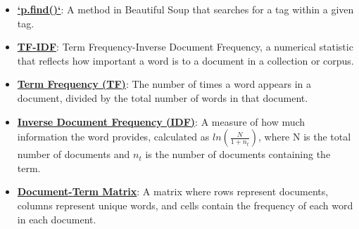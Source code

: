 \documentclass{article}%
\begin{document}
\begin{itemize}[leftmargin=*]
\item \href{https://purdue.brightspace.com/d2l/common/assets/pdfjs-d2l-dist/1.0.14-legacy/web/viewer.html?file=\%2Fcontent\%2Fenforced\%2F1095465-WL.202510.CS24200.LE1\%2F05L1-parsing.pdf\%3Fou\%3D1095465\&lang=en-us\&container=d2l-fileviewer-rendered-pdf\&fullscreen=d2l-fileviewer-rendered-pdf-dialog\&height=667#page=19}{\textbf{`p.find()`}}: A method in Beautiful Soup that searches for a tag within a given tag.%
\item \href{https://purdue.brightspace.com/d2l/common/assets/pdfjs-d2l-dist/1.0.14-legacy/web/viewer.html?file=\%2Fcontent\%2Fenforced\%2F1095465-WL.202510.CS24200.LE1\%2F05L1-parsing.pdf\%3Fou\%3D1095465\&lang=en-us\&container=d2l-fileviewer-rendered-pdf\&fullscreen=d2l-fileviewer-rendered-pdf-dialog\&height=667#page=21}{\textbf{TF{-}IDF}}: Term Frequency-Inverse Document Frequency, a numerical statistic that reflects how important a word is to a document in a collection or corpus.%
\item \href{https://purdue.brightspace.com/d2l/common/assets/pdfjs-d2l-dist/1.0.14-legacy/web/viewer.html?file=\%2Fcontent\%2Fenforced\%2F1095465-WL.202510.CS24200.LE1\%2F05L1-parsing.pdf\%3Fou\%3D1095465\&lang=en-us\&container=d2l-fileviewer-rendered-pdf\&fullscreen=d2l-fileviewer-rendered-pdf-dialog\&height=667#page=25}{\textbf{Term Frequency (TF)}}: The number of times a word appears in a document, divided by the total number of words in that document.%
\item \href{https://purdue.brightspace.com/d2l/common/assets/pdfjs-d2l-dist/1.0.14-legacy/web/viewer.html?file=\%2Fcontent\%2Fenforced\%2F1095465-WL.202510.CS24200.LE1\%2F05L1-parsing.pdf\%3Fou\%3D1095465\&lang=en-us\&container=d2l-fileviewer-rendered-pdf\&fullscreen=d2l-fileviewer-rendered-pdf-dialog\&height=667#page=25}{\textbf{Inverse Document Frequency (IDF)}}: A measure of how much information the word provides, calculated as $ln(\frac{N}{1 + n_t})$, where N is the total number of documents and $n_t$ is the number of documents containing the term.%
\item \href{https://purdue.brightspace.com/d2l/common/assets/pdfjs-d2l-dist/1.0.14-legacy/web/viewer.html?file=\%2Fcontent\%2Fenforced\%2F1095465-WL.202510.CS24200.LE1\%2F05L1-parsing.pdf\%3Fou\%3D1095465\&lang=en-us\&container=d2l-fileviewer-rendered-pdf\&fullscreen=d2l-fileviewer-rendered-pdf-dialog\&height=667#page=26}{\textbf{Document{-}Term Matrix}}: A matrix where rows represent documents, columns represent unique words, and cells contain the frequency of each word in each document.%

\end{itemize}
\end{document}
